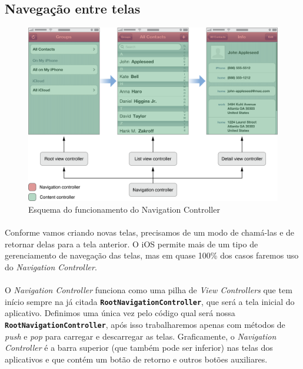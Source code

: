 \documentclass[a4paper,12pt,brazil,doubleside]{book}
\begin{document}
\bigskip

\subsection{Navegação entre telas}

\bigskip

\begin{figure}[h]
  \centering
  \includegraphics[totalheight=0.35\textheight]{../figuras/ios/apple_navigation_interface.png}
  \caption{Esquema do funcionamento do Navigation Controller}
  \label{fig:a}
\end{figure}

\bigskip

\paragraph{}Conforme vamos criando novas telas, precisamos de um modo de chamá-las e de retornar delas para a tela anterior. O iOS permite mais de um tipo de gerenciamento de navegação das telas, mas em quase 100\% dos casos faremos uso do \emph{Navigation Controller}.
\paragraph{}O \emph{Navigation Controller} funciona como uma pilha de \emph{View Controllers} que tem início sempre na já citada \texttt{\textbf{RootNavigationController}}, que será a tela inicial do aplicativo. Definimos uma única vez pelo código qual será nossa \texttt{\textbf{RootNavigationController}}, após isso trabalharemos apenas com métodos de \emph{push} e \emph{pop} para carregar e descarregar as telas. Graficamente, o \emph{Navigation Controller} é a barra superior (que também pode ser inferior) nas telas dos aplicativos e que contém um botão de retorno e outros botões auxiliares.
\end{document}
